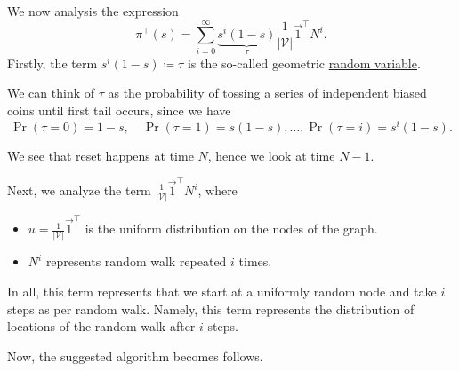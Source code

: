 We now analysis the expression
\[
	\pi^{\top}(s) = \sum\limits_{i=0}^{\infty} \underbrace{s^i (1 - s)}_{\tau}\frac{1}{\left\vert \mathcal{V}  \right\vert}\vec{1}^{\top}N^i.
\]
Firstly, the term \(s^i(1-s) \coloneqq \tau\) is the so-called geometric \hyperref[def:random-variable]{random variable}.
\begin{intuition}\label{int:geometric-random-variable}
	We can think of \(\tau\) as the probability of tossing a series of \hyperref[def:independent]{independent} biased coins until first tail occurs, since we have
	\[
		\Pr(\tau = 0) = 1 - s,\quad
		\Pr(\tau = 1) = s(1 - s), \dots,
		\Pr(\tau = i) = s^i(1 - s).
	\]
\end{intuition}
\begin{remark}
	We see that reset happens at time \(N\), hence we look at time \(N-1\).
\end{remark}

Next, we analyze the term \(\frac{1}{\left\vert \mathcal{V}  \right\vert}\vec{1}^{\top}N^i\), where
\begin{itemize}
	\item \(u = \frac{1}{\left\vert \mathcal{V}  \right\vert}\vec{1}^{\top}\) is the uniform distribution on the nodes of the graph.
	\item \(N^i\) represents random walk repeated \(i\) times.
\end{itemize}

\begin{intuition}
	In all, this term represents that we start at a uniformly random node and take \(i\) steps as per random walk. Namely, this term represents the distribution of locations of the random walk after \(i\) steps.
\end{intuition}

Now, the suggested algorithm becomes follows.

